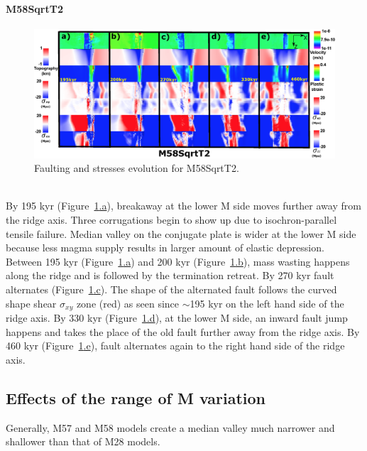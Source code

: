 \paragraph{M58SqrtT2}\label{para_M58SqrtT2}

\begin{figure}[h]
 \centering
  \includegraphics[width=1.0\textwidth]{./Figures/fig_Results_Weakening_8_M58SqrtT2_time_evolution.eps}
 \caption{Faulting and stresses evolution for M58SqrtT2.}
\label{fig_Results_Weakenging_8}
\end{figure}

~\\
By 195 kyr (Figure~\hyperref[fig_Results_Weakenging_8]{\ref{fig_Results_Weakenging_8}.a}), breakaway at the lower M side moves further away from the ridge axis. Three corrugations begin to show up due to isochron-parallel tensile failure. Median valley on the conjugate plate is wider at the lower M side because less magma supply results in larger amount of elastic depression. Between 195 kyr (Figure~\hyperref[fig_Results_Weakenging_8]{\ref{fig_Results_Weakenging_8}.a}) and 200 kyr (Figure~\hyperref[fig_Results_Weakenging_8]{\ref{fig_Results_Weakenging_8}.b}), mass wasting happens along the ridge and is followed by the termination retreat. By 270 kyr fault alternates (Figure~\hyperref[fig_Results_Weakenging_8]{\ref{fig_Results_Weakenging_8}.c}). The shape of the alternated fault follows the curved shape shear $\sigma_{xy}$ zone (red) as seen since $\sim$195 kyr on the left hand side of the ridge axis. By 330 kyr (Figure~\hyperref[fig_Results_Weakenging_8]{\ref{fig_Results_Weakenging_8}.d}), at the lower M side, an inward fault jump happens and takes the place of the old fault further away from the ridge axis. By 460 kyr (Figure~\hyperref[fig_Results_Weakenging_8]{\ref{fig_Results_Weakenging_8}.e}), fault alternates again to the right hand side of the ridge axis.

\subsection{Effects of the range of M variation}
Generally, M57 and M58 models create a median valley much narrower and shallower than that of M28 models.

